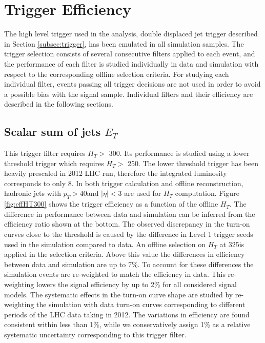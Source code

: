 \section{Trigger Efficiency}
\label{sec:trigeff}

The high level trigger used in the analysis, double displaced jet trigger described
in Section \ref{subsec:trigger}, has been emulated in all
 simulation samples. The trigger selection consists of several consecutive filters applied to each event, 
and the performance of each filter is studied individually in data and simulation with respect to 
the corresponding offline selection criteria. For studying each individual filter, events 
passing all trigger decisions 
are not used in order to avoid a possible bias with the signal sample. Individual filters and their efficiency are
described in the following sections.  

\subsection{Scalar sum of jets $E_T$}
\label{subsec:trigHT}
This trigger filter requires $H_T > $ 300\GeV. Its performance is studied using a lower threshold trigger which 
requires $H_T >$ 250\GeV. 
The lower threshold trigger has been heavily prescaled in 2012 LHC run, therefore the integrated luminosity corresponds to only 8\pbinv. 
In both trigger calculation and offline reconstruction, hadronic jets with $p_T>$40\GeV and $|\eta|<$3 are used
 for $H_T$ computation. 
Figure \ref{fig:effHT300} shows the trigger efficiency as a function of the offline $H_T$. 
The difference in performance between data and simulation can be inferred from the efficiency ratio 
shown at the bottom. The observed discrepancy in the turn-on curves close to the threshold is caused by the 
difference in Level 1 trigger seeds used in the simulation compared to data.
An offline selection on 
$H_T$ at 325\GeV is applied in the selection criteria. 
Above this value the differences in efficiency between data and simulation are up to
7\%. To account for these differences the simulation events are re-weighted to match the efficiency in data.
This re-weighting
lowers the signal efficiency by up to 2\% for all considered signal models. The systematic effects in the turn-on
curve shape are studied by re-weighting the simulation with data turn-on curves corresponding to
 different periods of the LHC data taking in 2012. The variations in efficiency are found consistent within 
less than 1\%, while we conservatively assign 1\% as a relative 
systematic uncertainty corresponding to this trigger filter.      

